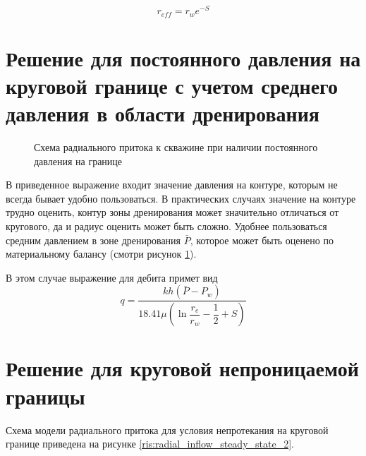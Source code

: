 \begin{equation}
	r_{eff} = r_w e^{-S}
\end{equation}




\section{Решение для постоянного давления на круговой границе с учетом среднего давления в области дренирования}

\begin{figure}[h!]
	\begin{center}
		
		\caption{Схема радиального притока к скважине при наличии постоянного давления на границе}
		\label{ris:radial_inflow_steady_state_average_pressure}
	\end{center}
\end{figure}

В приведенное выражение входит значение давления на контуре, которым не всегда бывает удобно пользоваться. В практических случаях значение на контуре трудно оценить, контур зоны дренирования может значительно отличаться от кругового, да и радиус оценить может быть сложно. Удобнее пользоваться средним давлением в зоне дренирования $\bar{P}$, которое может быть оценено по материальному балансу (смотри рисунок \ref{ris:radial_inflow_steady_state_average_pressure}). 



В этом случае выражение для дебита примет вид
$$q=\frac{kh\left( \bar{P}-P_w\right)}{ 18.41 \mu\left(\ln{\dfrac{r_e}{r_w}}  - \dfrac{1}{2}+ S \right)}$$


\section{Решение для круговой непроницаемой границы}

Схема модели радиального притока для условия непротекания на круговой границе приведена на рисунке \ref{ris:radial_inflow_steady_state_2}.

